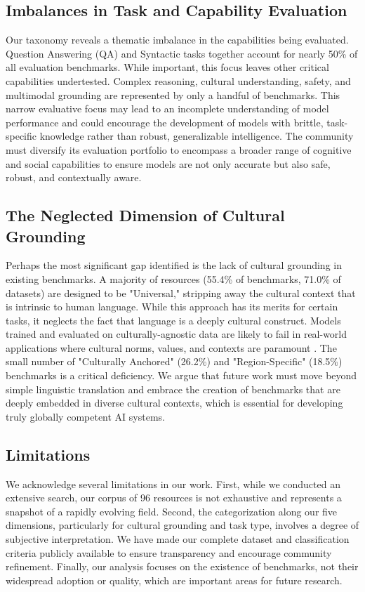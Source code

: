 \documentclass[acmsmall]{acmart}
\begin{document}
\subsection{Imbalances in Task and Capability Evaluation}

Our taxonomy reveals a thematic imbalance in the capabilities being evaluated. Question Answering (QA) and Syntactic tasks together account for nearly 50\% of all evaluation benchmarks. While important, this focus leaves other critical capabilities undertested. Complex reasoning, cultural understanding, safety, and multimodal grounding are represented by only a handful of benchmarks. This narrow evaluative focus may lead to an incomplete understanding of model performance and could encourage the development of models with brittle, task-specific knowledge rather than robust, generalizable intelligence. The community must diversify its evaluation portfolio to encompass a broader range of cognitive and social capabilities to ensure models are not only accurate but also safe, robust, and contextually aware.

\subsection{The Neglected Dimension of Cultural Grounding}

Perhaps the most significant gap identified is the lack of cultural grounding in existing benchmarks. A majority of resources (55.4\% of benchmarks, 71.0\% of datasets) are designed to be "Universal," stripping away the cultural context that is intrinsic to human language. While this approach has its merits for certain tasks, it neglects the fact that language is a deeply cultural construct. Models trained and evaluated on culturally-agnostic data are likely to fail in real-world applications where cultural norms, values, and contexts are paramount \citep{10.1162/tacl_a_00760}. The small number of "Culturally Anchored" (26.2\%) and "Region-Specific" (18.5\%) benchmarks is a critical deficiency. We argue that future work must move beyond simple linguistic translation and embrace the creation of benchmarks that are deeply embedded in diverse cultural contexts, which is essential for developing truly globally competent AI systems.

\subsection{Limitations}

We acknowledge several limitations in our work. First, while we conducted an extensive search, our corpus of 96 resources is not exhaustive and represents a snapshot of a rapidly evolving field. Second, the categorization along our five dimensions, particularly for cultural grounding and task type, involves a degree of subjective interpretation. We have made our complete dataset and classification criteria publicly available to ensure transparency and encourage community refinement. Finally, our analysis focuses on the existence of benchmarks, not their widespread adoption or quality, which are important areas for future research.
\end{document}
